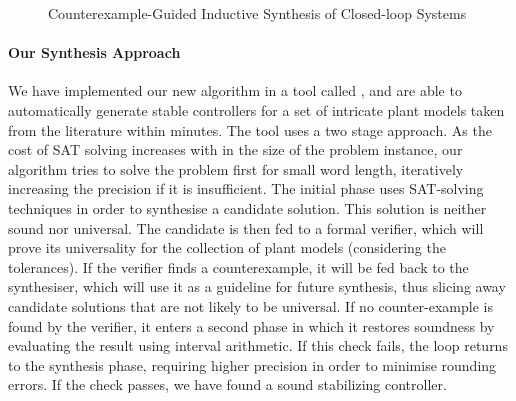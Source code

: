 \documentclass[final]{sig-alternate-05-2015}
\begin{document}
\begin{figure*}[h!tb]
{
}
\caption{Counterexample-Guided Inductive Synthesis of Closed-loop Systems
\label{fig:CEGIS}}
\end{figure*}
%

\paragraph{Our Synthesis Approach}
We have implemented our new algorithm in a tool called \tool, and are able
to automatically generate stable controllers for a set of intricate plant
models taken from the literature within minutes.
The tool uses a two stage approach. 
As the cost of SAT solving increases with in the size of the problem
instance, our algorithm tries to solve the problem first for small word length,
iteratively increasing the precision if it is insufficient.
The initial phase uses SAT-solving
techniques in order to synthesise a candidate solution. This solution is neither sound nor universal.
The candidate is then fed to a formal verifier, which will prove its universality for the collection of plant models (considering the tolerances). If the verifier finds a counterexample, it will be fed back to the synthesiser, which will use it as a guideline for future synthesis, thus slicing away candidate solutions that are not likely to be universal. If no counter-example is found by the verifier, it enters a second phase in which it restores soundness by evaluating the result using interval arithmetic. If this check fails, the loop returns to the synthesis phase, requiring higher precision in order to minimise rounding errors. If the check passes, we have found a sound stabilizing controller.
%
\end{document}

